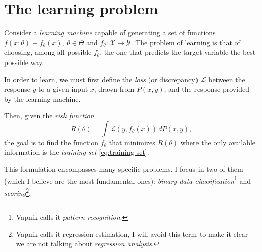 \section{The learning problem}

Consider a \emph{learning machine} capable of generating a set of functions $f(x;
\theta) \equiv f_\theta(x)$, $\theta \in \Theta$ and $f_\theta : \mathcal{X} \rightarrow \mathcal{Y}$.
The problem of learning is that of choosing, among all possible $f_\theta$, the one that
predicts the target variable the best possible way.

In order to learn, we must first define the \emph{loss} (or discrepancy) $\mathcal{L}$
between the response $y$ to a given input $x$, drawn from $P(x, y)$, and the
response provided by the learning machine.

Then, given the \emph{risk function} $$R(\theta) = \int \mathcal{L}(y, f_\theta(x))\,
dP(x, y)\text{,}$$ the goal is to find the function $f_\theta$ that minimizes $R(\theta)$
where the only available information is the \emph{training set} \eqref{eq:training-set}.

This formulation encompasses many specific problems. I focus in two of them (which I
believe are the most fundamental ones): \emph{binary data classification}\footnote{Vapnik
calls it \emph{pattern recognition}.} and \emph{scoring}\footnote{Vapnik calls it regression
estimation, I will avoid this term to make it clear we are not talking about
\emph{regression analysis}.}.
